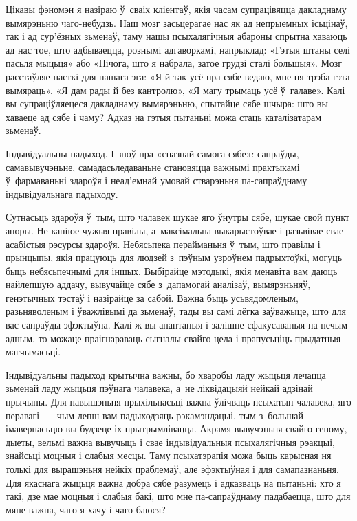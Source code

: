 Цікавы фэномэн я назіраю ў~сваіх кліентаў, якія часам супрацівяцца дакладнаму вымярэньню чаго-небудзь. Наш мозг засьцерагае нас як ад непрыемных ісьцінаў, так і ад сур'ёзных зьменаў, таму нашы псыхалягічныя абароны спрытна хаваюць ад нас тое, што адбываецца, рознымі адгаворкамі, напрыклад: «Гэтыя штаны селі пасьля мыцьця» або «Нічога, што я набрала, затое грудзі сталі большыя». Мозг расстаўляе пасткі для нашага эга: «Я й так усё пра сябе ведаю, мне ня трэба гэта вымяраць», «Я дам рады й без кантролю», «Я магу трымаць усё ў~галаве». Калі вы супраціўляецеся дакладнаму вымярэньню, спытайце сябе шчыра: што вы хаваеце ад сябе і чаму? Адказ на гэтыя пытаньні можа стаць каталізатарам зьменаў.

Індывідуальны падыход. І зноў пра «спазнай самога сябе»: сапраўды, самавывучэньне, самадасьледаваньне становяцца важнымі практыкамі ў~фармаваньні здароўя і неад'емнай умовай стварэньня па-сапраўднаму індывідуальнага падыходу.

Сутнасьць здароўя ў~тым, што чалавек шукае яго ўнутры сябе, шукае свой пункт апоры. Не капіюе чужыя правілы, а~максімальна выкарыстоўвае і разьвівае свае асабістыя рэсурсы здароўя. Небясьпека перайманьня ў~тым, што правілы і прынцыпы, якія працуюць для людзей з~пэўным узроўнем падрыхтоўкі, могуць быць небясьпечнымі для іншых. Выбірайце мэтодыкі, якія менавіта вам даюць найлепшую аддачу, вывучайце сябе з~дапамогай аналізаў, вымярэньняў, генэтычных тэстаў і назірайце за сабой. Важна быць усьвядомленым, разьняволеным і ўважлівымі да зьменаў, тады вы самі лёгка заўважыце, што для вас сапраўды эфэктыўна. Калі ж вы апантаныя і залішне сфакусаваныя на нечым адным, то можаце праігнараваць сыгналы свайго цела і прапусьціць прыдатныя магчымасьці.

Індывідуальны падыход крытычна важны, бо хваробы ладу жыцьця лечацца зьменай ладу жыцьця пэўнага чалавека, а~не ліквідацыяй нейкай адзінай прычыны. Для павышэньня прыхільнасьці важна ўлічваць псыхатып чалавека, яго перавагі~--- чым лепш вам падыходзяць рэкамэндацыі, тым з~большай імавернасьцю вы будзеце іх прытрымлівацца. Акрамя вывучэньня свайго геному, дыеты, вельмі важна вывучыць і свае індывідуальныя псыхалягічныя рэакцыі, знайсьці моцныя і слабыя месцы. Таму псыхатэрапія можа быць карысная ня толькі для вырашэньня нейкіх праблемаў, але эфэктыўная і для самапазнаньня. Для якаснага жыцьця важна добра сябе разумець і адказваць на пытаньні: хто я такі, дзе мае моцныя і слабыя бакі, што мне па-сапраўднаму падабаецца, што для мяне важна, чаго я хачу і чаго баюся?

